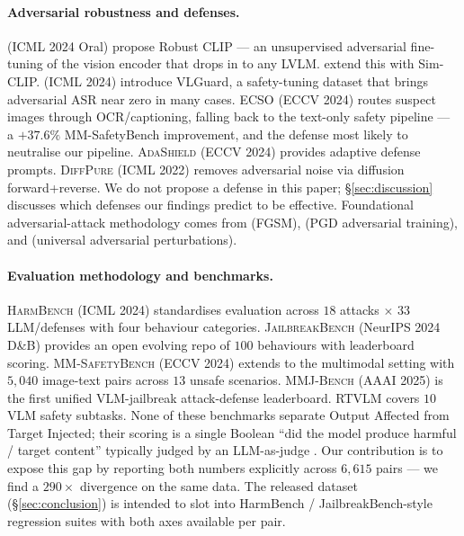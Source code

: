 \paragraph{Adversarial robustness and defenses.}
\citet{schlarmann2024robustclip} (ICML 2024 Oral) propose Robust CLIP --- an unsupervised adversarial fine-tuning of the vision encoder that drops in to any LVLM. \citet{hossain2024simclip} extend this with Sim-CLIP. \citet{zong2024vlguard} (ICML 2024) introduce VLGuard, a safety-tuning dataset that brings adversarial ASR near zero in many cases. \textsc{ECSO} \citep{gou2024ecso} (ECCV 2024) routes suspect images through OCR/captioning, falling back to the text-only safety pipeline --- a $+37.6\%$ MM-SafetyBench improvement, and the defense most likely to neutralise our pipeline. \textsc{AdaShield} \citep{wang2024adashield} (ECCV 2024) provides adaptive defense prompts. \textsc{DiffPure} \citep{nie2022diffpure} (ICML 2022) removes adversarial noise via diffusion forward+reverse. We do not propose a defense in this paper; \S\ref{sec:discussion} discusses which defenses our findings predict to be effective. Foundational adversarial-attack methodology comes from \citet{goodfellow2015explaining} (FGSM), \citet{madry2018pgd} (PGD adversarial training), and \citet{moosavi2017uap} (universal adversarial perturbations).

\paragraph{Evaluation methodology and benchmarks.}
\textsc{HarmBench} \citep{mazeika2024harmbench} (ICML 2024) standardises evaluation across $18$ attacks $\times$ $33$ LLM/defenses with four behaviour categories. \textsc{JailbreakBench} \citep{chao2024jailbreakbench} (NeurIPS 2024 D\&B) provides an open evolving repo of $100$ behaviours with leaderboard scoring. \textsc{MM-SafetyBench} \citep{liu2024mmsafetybench} (ECCV 2024) extends to the multimodal setting with $5{,}040$ image-text pairs across $13$ unsafe scenarios. \textsc{MMJ-Bench} \citep{weng2025mmjbench} (AAAI 2025) is the first unified VLM-jailbreak attack-defense leaderboard. \textsc{RTVLM} \citep{li2024rtvlm} covers $10$ VLM safety subtasks. None of these benchmarks separate Output Affected from Target Injected; their scoring is a single Boolean ``did the model produce harmful / target content'' typically judged by an LLM-as-judge \citep{zheng2023judge}. Our contribution is to expose this gap by reporting both numbers explicitly across $6{,}615$ pairs --- we find a $290\times$ divergence on the same data. The released dataset (\S\ref{sec:conclusion}) is intended to slot into HarmBench / JailbreakBench-style regression suites with both axes available per pair.
